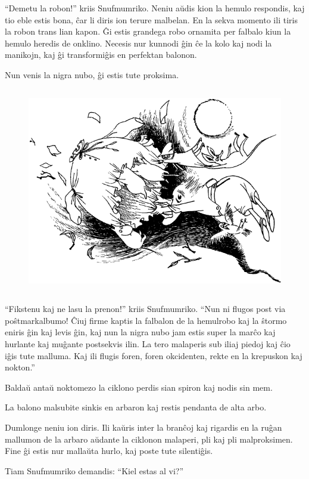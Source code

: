 ``Demetu la robon!'' kriis Snufmumriko. Neniu aŭdis kion la hemulo respondis, kaj tio eble estis bona, ĉar li diris ion terure malbelan. En la sekva momento ili tiris la robon trans lian kapon. Ĝi estis grandega robo ornamita per falbalo kiun la hemulo heredis de onklino. Necesis nur kunnodi ĝin ĉe la kolo kaj nodi la manikojn, kaj ĝi transformiĝis en perfektan balonon.

Nun venis la nigra nubo, ĝi estis tute proksima.

\begin{figure}[htbp]
\centering
\includegraphics[width=350pt,height=255pt]{8-8.png}
\caption{}
\label{8-8}
\end{figure}

``Fikstenu kaj ne lasu la prenon!'' kriis Snufmumriko. ``Nun ni flugos post via poŝtmarkalbumo! Ĉiuj firme kaptis la falbalon de la hemulrobo kaj la ŝtormo eniris ĝin kaj levis ĝin, kaj nun la nigra nubo jam estis super la marĉo kaj hurlante kaj muĝante postsekvis ilin. La tero malaperis sub iliaj piedoj kaj ĉio iĝis tute malluma. Kaj ili flugis foren, foren okcidenten, rekte en la krepuskon kaj nokton.''

\sectionbreak

Baldaŭ antaŭ noktomezo la ciklono perdis sian spiron kaj nodis sin mem.

La balono malsubite sinkis en arbaron kaj restis pendanta de alta arbo.

Dumlonge neniu ion diris. Ili kaŭris inter la branĉoj kaj rigardis en la ruĝan mallumon de la arbaro aŭdante la ciklonon malaperi, pli kaj pli malproksimen. Fine ĝi estis nur mallaŭta hurlo, kaj poste tute silentiĝis.

Tiam Snufmumriko demandis: ``Kiel estas al vi?''

